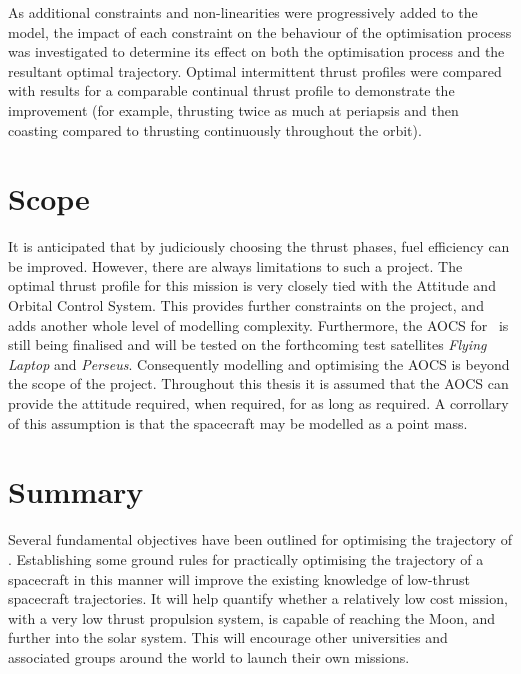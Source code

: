 As additional constraints and non-linearities were progressively added to the model, the impact of each constraint on the behaviour of the optimisation process was investigated to determine its effect on both the optimisation process and the resultant optimal trajectory. Optimal intermittent thrust profiles were compared with results for a comparable continual thrust profile to demonstrate the improvement (for example, thrusting twice as much at periapsis and then coasting compared to thrusting continuously throughout the orbit). 

\section{Scope}

It is anticipated that by judiciously choosing the thrust phases, fuel efficiency can be improved. However, there are always limitations to such a project. The optimal thrust profile for this mission is very closely tied with the Attitude and Orbital Control System. This provides further constraints on the project, and adds another whole level of modelling complexity. Furthermore, the AOCS for \BW\ is still being finalised and will be tested on the forthcoming test satellites \emph{Flying Laptop} and \emph{Perseus}. Consequently modelling and optimising the AOCS is beyond the scope of the project. Throughout this thesis it is assumed that the AOCS can provide the attitude required, when required, for as long as required. A corrollary of this assumption is that the spacecraft may be modelled as a point mass.

\section{Summary} \label{sec:Objective-summary}

Several fundamental objectives have been outlined for optimising the trajectory of \BW. Establishing some ground rules for practically optimising the trajectory of a spacecraft in this manner will improve the existing knowledge of low-thrust spacecraft trajectories. It will help quantify whether a relatively low cost mission, with a very low thrust propulsion system, is capable of reaching the Moon, and further into the solar system. This will encourage other universities and associated groups around the world to launch their own missions.